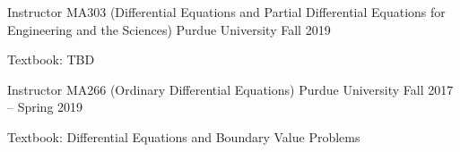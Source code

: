 

\begin{cventries}

  \cventry
    {Instructor} %
    {MA303 (Differential Equations and Partial Differential Equations for Engineering and the Sciences)} %
    {Purdue University} %
    {Fall 2019} %
    {
      \begin{cvitems} %
        \item {Textbook: TBD}
      \end{cvitems}
    }

  \cventry
    {Instructor} %
    {MA266 (Ordinary Differential Equations)} %
    {Purdue University} %
    {Fall 2017 -- Spring 2019} %
    {
      \begin{cvitems} %
        \item {Textbook: Differential Equations and Boundary Value Problems}
      \end{cvitems}
    }

\end{cventries}
